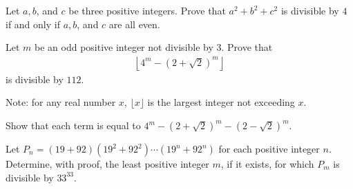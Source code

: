 \documentclass{subfile}
\begin{document}
	\begin{problem}[Slovenia 2010]
		Let $a,b$, and $c$ be three positive integers. Prove that $a^2+b^2+c^2$ is divisible by $4$ if and only if $a,b$, and $c$ are all even. %
	\end{problem}

%

	\begin{problem}
		Let $m$ be an odd positive integer not divisible by $3$. Prove that
			\begin{align*}
				\left\lfloor  4^m -(2+\sqrt 2)^m \right\rfloor
			\end{align*}
		is divisible by $112.$ %

		Note: for any real number $x$, $\lfloor x \rfloor$ is the largest integer not exceeding $x$.
	\end{problem}

	\begin{hint}
		Show that each term is equal to $4^m-(2+\sqrt 2)^m-(2-\sqrt 2)^m$.
	\end{hint}

%

	\begin{problem}
		Let $P_n = (19 + 92)(19^2 +92^2) \cdots(19^n +92^n)$ for each positive integer $n$. Determine, with proof, the least positive integer $m$, if it exists, for which $P_m$ is divisible by $33^{33}.$ %
	\end{problem}
\end{document}

